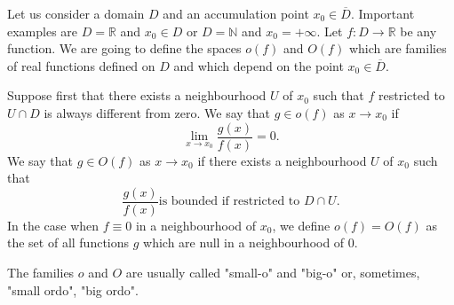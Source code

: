 \documentclass[12pt]{article}
\newcommand{\R}{\mathbb R}
\theoremstyle{remark}
\begin{document}
Let us consider a domain $D$ and an accumulation point $x_0\in \overline D$. Important examples are $D=\R$ and $x_0\in D$ or $D=\mathbb N$ and $x_0=+\infty$. Let $f\colon D\to \R$ be any function. We are going to define the spaces $o(f)$ and $O(f)$ which are families of real functions defined on $D$ and which depend on the point $x_0\in \overline D$. 

Suppose first that there exists a neighbourhood $U$ of $x_0$ such that $f$ restricted to $U\cap D$ is always different from zero.
We say that $g\in o(f)$  as $x\to x_0$ if
\[
  \lim_{x\to x_0} \frac{g(x)}{f(x)}=0.
\]
We say that $g \in O(f)$ as $x\to x_0$ if there exists a neighbourhood $U$ of $x_0$ such that 
\[
  \frac{g(x)}{f(x)} \text{is bounded if restricted to $D\cap U$}.
\]
In the case when $f\equiv 0$ in a neighbourhood of $x_0$, we define $o(f)=O(f)$ as the set of all functions $g$ which are null in a neighbourhood of $0$.

The families $o$ and $O$ are usually called "small-o" and "big-o" or, sometimes,
"small ordo", "big ordo".

\end{document}
